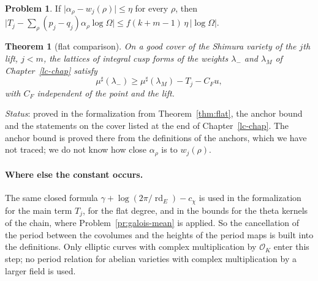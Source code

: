 \documentclass[reqno]{amsart}
\newcounter{chap}
\theoremstyle{definition}
\newtheorem{problem}{Problem}[section]
\theoremstyle{plain}
\newtheorem{theorem}{Theorem}[section]
\theoremstyle{remark}
\newcommand{\Oc}{\mathcal O}
\newcommand{\rd}{\operatorname{rd}}
\newcommand{\mus}{\mu^\sharp}
\begin{document}
\begin{problem}\label{pr:anchor-error}
If \(\lvert\alpha_\rho - w_j(\rho)\rvert \le \eta\) for every \(\rho\), then \(\bigl\lvert T_j - \sum_\rho(p_j - q_j)\alpha_\rho\log\Omega\bigr\rvert \le f(k + m - 1)\,\eta\,\lvert\log\Omega\rvert\).
\end{problem}

\begin{theorem}[flat comparison]\label{thm:flatat}
On a good cover of the Shimura variety of the \(j\)th lift, \(j < m\), the lattices of integral cusp forms of the weights \(\lambda_-\) and \(\lambda_M\) of Chapter~\ref{lc-chap} satisfy
\[
  \mus(\lambda_-) \ge \mus(\lambda_M) - T_j - C_Fu ,
\]
with \(C_F\) independent of the point and the lift.
\end{theorem}
\noindent\emph{Status}: proved in the formalization from Theorem~\ref{thm:flat}, the anchor bound and the statements on the cover listed at the end of Chapter~\ref{lc-chap}.  The anchor bound is proved there from the definitions of the anchors, which we have not traced; we do not know how close \(\alpha_\rho\) is to \(w_j(\rho)\).

\paragraph{Where else the constant occurs.}  The same closed formula \(\gamma + \log(2\pi/\rd_E) - c_\chi\) is used in the formalization for the main term \(T_j\), for the flat degree, and in the bounds for the theta kernels of the chain, where Problem~\ref{pr:galois-mean} is applied.  So the cancellation of the period between the covolumes and the heights of the period maps is built into the definitions.  Only elliptic curves with complex multiplication by \(\Oc_K\) enter this step; no period relation for abelian varieties with complex multiplication by a larger field is used.
\end{document}
